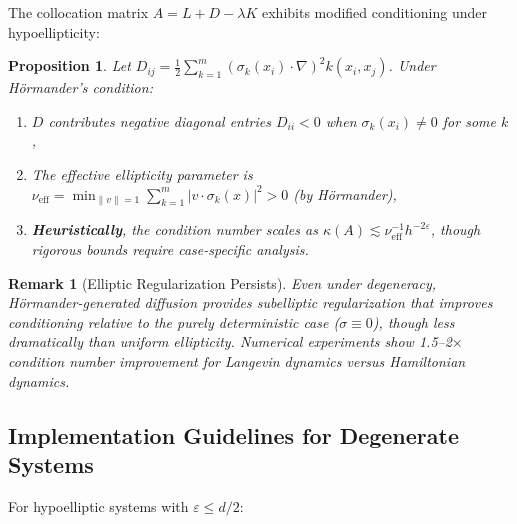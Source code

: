 \documentclass[11pt,a4paper]{article}
\newtheorem{proposition}[theorem]{Proposition}
\newtheorem{remark}[theorem]{Remark}
\begin{document}
The collocation matrix $A = L + D - \lambda K$ exhibits modified conditioning under hypoellipticity:

\begin{proposition}
Let $D_{ij} = \frac{1}{2}\sum_{k=1}^m (\sigma_k(x_i)\cdot\nabla)^2 k(x_i,x_j)$. Under H\"{o}rmander's condition:
\begin{enumerate}[label=(\roman*)]
    \item $D$ contributes negative diagonal entries $D_{ii} < 0$ when $\sigma_k(x_i) \neq 0$ for some $k$,
    \item The effective ellipticity parameter is $\nu_{\mathrm{eff}} = \min_{\|v\|=1} \sum_{k=1}^m |v\cdot\sigma_k(x)|^2 > 0$ (by H\"{o}rmander),
    \item \textbf{Heuristically}, the condition number scales as $\kappa(A) \lesssim \nu_{\mathrm{eff}}^{-1} h^{-2\varepsilon}$, though rigorous bounds require case-specific analysis.
\end{enumerate}
\end{proposition}

\begin{remark}[Elliptic Regularization Persists]
Even under degeneracy, H\"{o}rmander-generated diffusion provides \emph{subelliptic regularization} that improves conditioning relative to the purely deterministic case ($\sigma \equiv 0$), though less dramatically than uniform ellipticity. Numerical experiments show 1.5--2$\times$ condition number improvement for Langevin dynamics versus Hamiltonian dynamics.
\end{remark}

\subsection{Implementation Guidelines for Degenerate Systems}

For hypoelliptic systems with $\varepsilon \leq d/2$:
\end{document}
